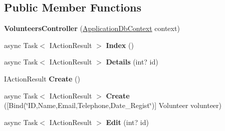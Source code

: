 \subsection*{Public Member Functions}
\begin{DoxyCompactItemize}
\item 
\mbox{\label{class_projeto_e_s_w_1_1_controllers_1_1_volunteers_controller_a8d95702ff23946f62114c0c39f0e9b0d}} 
{\bfseries Volunteers\+Controller} (\mbox{\hyperlink{class_projeto_e_s_w_1_1_data_1_1_application_db_context}{Application\+Db\+Context}} context)
\item 
\mbox{\label{class_projeto_e_s_w_1_1_controllers_1_1_volunteers_controller_aaf6cc0ab4f069f8ad08755145a48b250}} 
async Task$<$ I\+Action\+Result $>$ {\bfseries Index} ()
\item 
\mbox{\label{class_projeto_e_s_w_1_1_controllers_1_1_volunteers_controller_afdd63675aa99320eca87c4102e487539}} 
async Task$<$ I\+Action\+Result $>$ {\bfseries Details} (int? id)
\item 
\mbox{\label{class_projeto_e_s_w_1_1_controllers_1_1_volunteers_controller_a7df6125e100c1bd0f6083472711141df}} 
I\+Action\+Result {\bfseries Create} ()
\item 
\mbox{\label{class_projeto_e_s_w_1_1_controllers_1_1_volunteers_controller_a2e77e8a0499eaf4ac5caeae50cdd28cf}} 
async Task$<$ I\+Action\+Result $>$ {\bfseries Create} (\mbox{[}Bind(\char`\"{}ID,Name,Email,Telephone,Date\+\_\+\+Regist\char`\"{})\mbox{]} Volunteer volunteer)
\item 
\mbox{\label{class_projeto_e_s_w_1_1_controllers_1_1_volunteers_controller_aae7eb9e24b16676aeeb9a7575e751d10}} 
async Task$<$ I\+Action\+Result $>$ {\bfseries Edit} (int? id)
\item 
\mbox{\label{class_projeto_e_s_w_1_1_controllers_1_1_volunteers_controller_aaee477e05cc25721694c9e17efadb8d8}} 

\end{DoxyCompactItemize}
